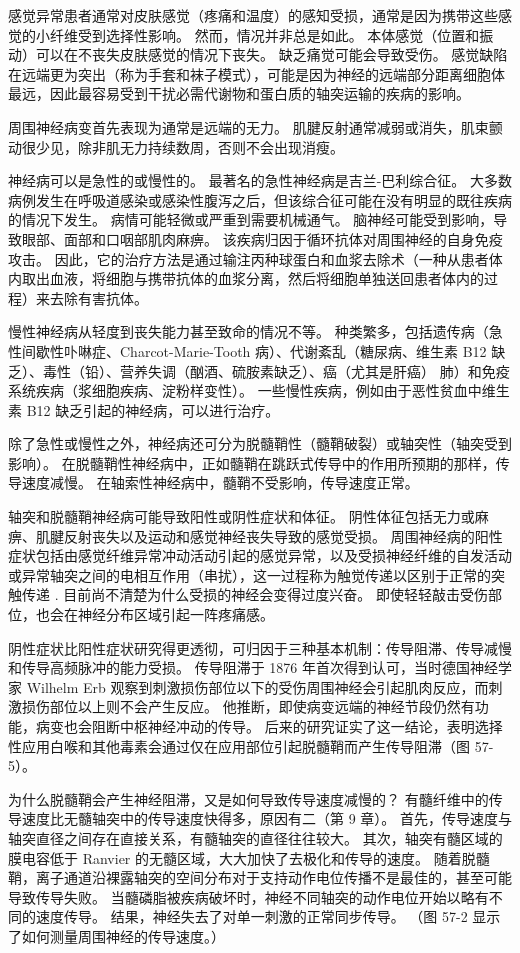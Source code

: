 感觉异常患者通常对皮肤感觉（疼痛和温度）的感知受损，通常是因为携带这些感觉的小纤维受到选择性影响。 然而，情况并非总是如此。 本体感觉（位置和振动）可以在不丧失皮肤感觉的情况下丧失。 缺乏痛觉可能会导致受伤。 感觉缺陷在远端更为突出（称为手套和袜子模式），可能是因为神经的远端部分距离细胞体最远，因此最容易受到干扰必需代谢物和蛋白质的轴突运输的疾病的影响。

周围神经病变首先表现为通常是远端的无力。 肌腱反射通常减弱或消失，肌束颤动很少见，除非肌无力持续数周，否则不会出现消瘦。

神经病可以是急性的或慢性的。 最著名的急性神经病是吉兰-巴利综合征。 大多数病例发生在呼吸道感染或感染性腹泻之后，但该综合征可能在没有明显的既往疾病的情况下发生。 病情可能轻微或严重到需要机械通气。 脑神经可能受到影响，导致眼部、面部和口咽部肌肉麻痹。 该疾病归因于循环抗体对周围神经的自身免疫攻击。 因此，它的治疗方法是通过输注丙种球蛋白和血浆去除术（一种从患者体内取出血液，将细胞与携带抗体的血浆分离，然后将细胞单独送回患者体内的过程）来去除有害抗体。

慢性神经病从轻度到丧失能力甚至致命的情况不等。 种类繁多，包括遗传病（急性间歇性卟啉症、Charcot-Marie-Tooth 病）、代谢紊乱（糖尿病、维生素 B12 缺乏）、毒性（铅）、营养失调（酗酒、硫胺素缺乏）、癌（尤其是肝癌） 肺）和免疫系统疾病（浆细胞疾病、淀粉样变性）。 一些慢性疾病，例如由于恶性贫血中维生素 B12 缺乏引起的神经病，可以进行治疗。

除了急性或慢性之外，神经病还可分为脱髓鞘性（髓鞘破裂）或轴突性（轴突受到影响）。 在脱髓鞘性神经病中，正如髓鞘在跳跃式传导中的作用所预期的那样，传导速度减慢。 在轴索性神经病中，髓鞘不受影响，传导速度正常。

轴突和脱髓鞘神经病可能导致阳性或阴性症状和体征。 阴性体征包括无力或麻痹、肌腱反射丧失以及运动和感觉神经丧失导致的感觉受损。 周围神经病的阳性症状包括由感觉纤维异常冲动活动引起的感觉异常，以及受损神经纤维的自发活动或异常轴突之间的电相互作用（串扰），这一过程称为触觉传递以区别于正常的突触传递 . 目前尚不清楚为什么受损的神经会变得过度兴奋。 即使轻轻敲击受伤部位，也会在神经分布区域引起一阵疼痛感。

阴性症状比阳性症状研究得更透彻，可归因于三种基本机制：传导阻滞、传导减慢和传导高频脉冲的能力受损。 传导阻滞于 1876 年首次得到认可，当时德国神经学家 Wilhelm Erb 观察到刺激损伤部位以下的受伤周围神经会引起肌肉反应，而刺激损伤部位以上则不会产生反应。 他推断，即使病变远端的神经节段仍然有功能，病变也会阻断中枢神经冲动的传导。 后来的研究证实了这一结论，表明选择性应用白喉和其他毒素会通过仅在应用部位引起脱髓鞘而产生传导阻滞（图 57-5）。

为什么脱髓鞘会产生神经阻滞，又是如何导致传导速度减慢的？ 有髓纤维中的传导速度比无髓轴突中的传导速度快得多，原因有二（第 9 章）。 首先，传导速度与轴突直径之间存在直接关系，有髓轴突的直径往往较大。 其次，轴突有髓区域的膜电容低于 Ranvier 的无髓区域，大大加快了去极化和传导的速度。 随着脱髓鞘，离子通道沿裸露轴突的空间分布对于支持动作电位传播不是最佳的，甚至可能导致传导失败。 当髓磷脂被疾病破坏时，神经不同轴突的动作电位开始以略有不同的速度传导。 结果，神经失去了对单一刺激的正常同步传导。 （图 57-2 显示了如何测量周围神经的传导速度。）

